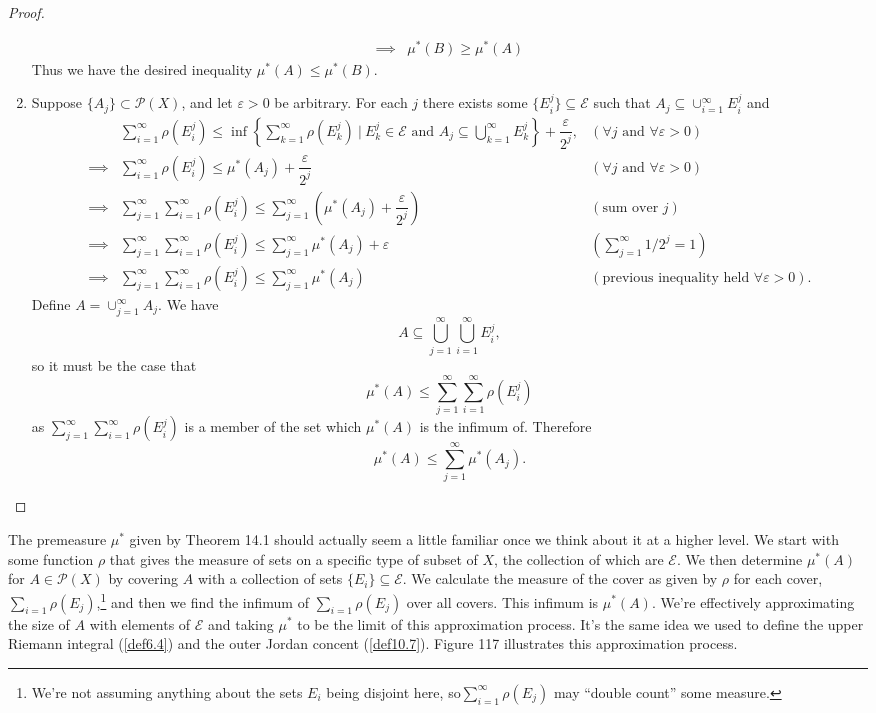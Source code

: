 \documentclass{article}
\theoremstyle{definition}
\begin{document}
\begin{proof}
\begin{enumerate}
\begin{align*}
 \implies & \mu^*(B)\ge \mu^*(A)
	\end{align*}
Thus we have the desired inequality $ \mu^*(A)\le \mu^*(B) $.
	\item Suppose $\{A_j\}\subset \mathcal P(X)$, and let $\varepsilon > 0$ be arbitrary. For each $j$ there exists some $\{E_i^j\}\subseteq \mathcal E$ such that $ A_j \subseteq \cup_{i=1}^\infty E_i^j$ and 
	\begin{align*}
		&\sum_{i=1}^\infty \rho(E_i^j)  \le \inf\left\{\sum_{k=1}^\infty \rho(E_k^j)\ \biggr| \ E_k^j\in\mathcal E\text{ and }A_j\subseteq \bigcup_{k=1}^\infty E_k^j\right\} + \dfrac{\varepsilon}{2^j}, &(\forall j\text{ and }\forall\varepsilon>0)\\
		\implies & \sum_{i=1}^\infty \rho(E_i^j)  \le \mu^*(A_j)+ \dfrac{\varepsilon}{2^j} &(\forall j\text{ and }\forall\varepsilon>0)\\
		\implies & \sum_{j=1}^\infty\sum_{i=1}^\infty \rho(E_i^j) \le  \sum_{j=1}^\infty\left(\mu^*(A_j)+ \dfrac{\varepsilon}{2^j} \right) & (\text{sum over }j)\\
		\implies  &\sum_{j=1}^\infty\sum_{i=1}^\infty \rho(E_i^j) \le   \sum_{j=1}^\infty\mu^*(A_j) + \varepsilon &(\textstyle\sum_{j=1}^\infty 1/2^j = 1)		\\
			\implies  &\sum_{j=1}^\infty\sum_{i=1}^\infty \rho(E_i^j) \le   \sum_{j=1}^\infty\mu^*(A_j) & (\text{previous inequality held }\forall \varepsilon >0).
	\end{align*}
	Define $A = \cup_{j=1}^\infty A_j$. We have $$A \subseteq  \bigcup_{j=1}^\infty \bigcup_{i=1}^\infty E_i^j,$$ so it must be the case that 
	$$ \mu^*(A) \le\sum_{j=1}^\infty\sum_{i=1}^\infty \rho(E_i^j) $$ as $\sum_{j=1}^\infty\sum_{i=1}^\infty \rho(E_i^j)$ is a member of the set which $ \mu^*(A)$ is the infimum of. Therefore 
	$$ \mu^*(A) \le \sum_{j=1}^\infty\mu^*(A_j).$$
	 
	\end{enumerate}
\end{proof}
 
The premeasure $\mu^*$ given by Theorem 14.1 should actually seem a little familiar once we think about it at a higher level. We start with some function $\rho$ that gives the measure of sets on a specific type of subset of $X$, the collection of which are $\mathcal E$. We then determine $\mu^*(A)$ for $A\in \mathcal P(X)$ by covering $A$ with a collection of sets $\{E_i\}\subseteq \mathcal E$. We calculate the measure of the cover as given by $\rho$ for each cover, $\sum_{i=1} \rho(E_j)$,\footnote{We're not assuming anything about the sets $E_i$ being disjoint here, so$\sum_{i=1}^\infty \rho(E_j)$ may ``double count'' some measure.} and then we find the infimum of $\sum_{i=1} \rho(E_j)$ over all covers. This infimum is $\mu^*(A)$. We're effectively approximating the size of $A$ with elements of $\mathcal E$ and taking $\mu^*$ to be the limit of this approximation process. It's the same idea we used to define the upper Riemann integral (\cref{def6.4}) and the outer Jordan concent (\cref{def10.7}). Figure 117 illustrates this approximation process. 
\end{document}
